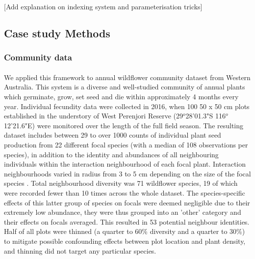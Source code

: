 \documentclass[a4,12pt]{article}
\begin{document}
    [Add explanation on indexing system and parameterisation tricks]




    



    \subsection{Case study Methods}
    \label{SI:casestudy}

        \subsubsection{Community data}

        \paragraph{}
        We applied this framework to annual wildflower community dataset from Western Australia. This system is a diverse and well-studied community of annual plants which germinate, grow, set seed and die within approximately 4 months every year. Individual fecundity data were collected in 2016, when 100 50 x 50 cm plots established in the understory of West Perenjori Reserve (29$^o$28'01.3"S 116$^o$12'21.6"E) were monitored over the length of the full field season. The resulting dataset includes between 29 to over 1000 counts of individual plant seed production from 22 different focal species (with a median of 108 observations per species), in addition to the identity and abundances of all neighbouring individuals within the interaction neighbourhood of each focal plant. Interaction neighbourhoods varied in radius from 3 to 5 cm depending on the size of the focal species \parencite{Martyn2020}. Total neighbourhood diversity was 71 wildflower species, 19 of which were recorded fewer than 10 times across the whole dataset. The species-specific effects of this latter group of species on focals were deemed negligible due to their extremely low abundance, they were thus grouped into an 'other' category and their effects on focals averaged. This resulted in 53 potential neighbour identities. Half of all plots were thinned (a quarter to 60\% diversity and a quarter to 30\%) to mitigate possible confounding effects between plot location and plant density, and thinning did not target any particular species. 
\end{document}
